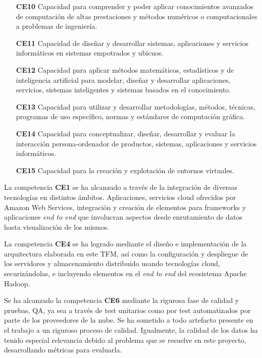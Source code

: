 \begin{itemize}
\item[\textbf{CE10}] Capacidad para comprender y poder aplicar conocimientos avanzados de
computación de altas prestaciones y métodos numéricos o computacionales a
problemas de ingeniería.
\item[\textbf{CE11}] Capacidad de diseñar y desarrollar sistemas, aplicaciones y servicios
informáticos
en sistemas empotrados y ubicuos.
\item[\textbf{CE12}] Capacidad para aplicar métodos matemáticos, estadísticos y de
inteligencia
artificial para modelar, diseñar y desarrollar aplicaciones, servicios, sistemas
inteligentes y sistemas basados en el conocimiento.
\item[\textbf{CE13}] Capacidad para utilizar y desarrollar metodologías, métodos, técnicas,
programas
de uso específico, normas y estándares de computación gráfica.

\item[\textbf{CE14}] Capacidad para conceptualizar, diseñar, desarrollar y evaluar la
interacción
persona-ordenador de productos, sistemas, aplicaciones y servicios informáticos.
\item[\textbf{CE15}] Capacidad para la creación y explotación de entornos virtuales.


\end{itemize}

La competencia \textbf{CE1} se ha alcanzado a través de la integración de
diversas tecnologías en distintos ámbitos. Aplicaciones, servicios cloud
ofrecidos por Amazon Web Services, integración y creación de elementos para
frameworks y aplicaciones \textit{end to end} que involucran aspectos desde
enrutamiento de datos hasta visualización de los mismos. 

La competencia \textbf{CE4} se ha logrado mediante el diseño e implementación de
la arquitectura elaborada en este TFM, así como la configuración y despliegue
de los servidores y almacenamiento distribuido usando tecnologías cloud,
securizándolas, e incluyendo elementos en el \textit{end to end} del
ecosistema Apache Hadoop. 


Se ha alcanzado la competencia \textbf{CE6} mediante la rigurosa fase de calidad
y pruebas, \acf{QA}, ya sea a través de test unitarios como por test
automatizados por parte de los proveedores de la nube. Se ha sometido a todo artefacto presente en el
trabajo a un riguroso proceso de calidad. Igualmente, la calidad de los datos ha tenido especial relevancia debido al
problema que se resuelve en este proyecto, desarrollando métricas para
evaluarla. 


